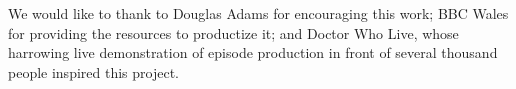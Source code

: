 We would like to thank to Douglas Adams for encouraging this work; BBC Wales for providing the resources to productize it; and Doctor Who Live, whose harrowing live demonstration of episode production in front of several thousand people inspired this project.
